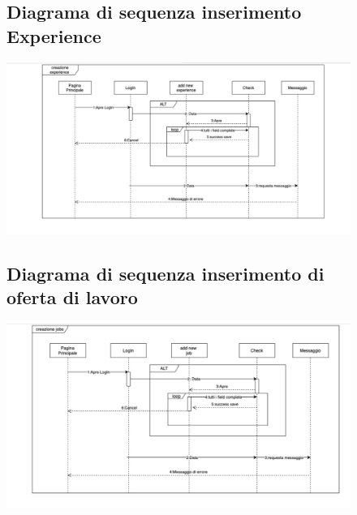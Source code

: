 \documentclass[ 4paper,11pt,openany]{book}
\begin{document}
\begin{figure}[htpb!] 
	\subsection{Diagrama di sequenza inserimento Experience}
	\includegraphics[width=180mm]{creazione_Experience.jpeg}
\end{figure}
\begin{figure}[htpb!] 
	\subsection{Diagrama di sequenza inserimento di oferta di lavoro}
	\includegraphics[width=180mm]{creazione_Job.jpeg}
\end{figure}
\end{document}
